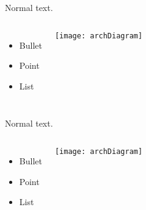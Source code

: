 \begin{frame}
  Normal text.

  \begin{columns}
      \begin{itemize}
      \item Bullet
      \item Point
      \item List
      \end{itemize}

      \texttt{[image: archDiagram]}
    \end{columns}
  
\end{frame}

\begin{frame}
  Normal text.

  \begin{columns}
      \begin{itemize}
      \item Bullet
      \item Point
      \item List
      \end{itemize}

      \texttt{[image: archDiagram]}
    \end{columns}
  
\end{frame}